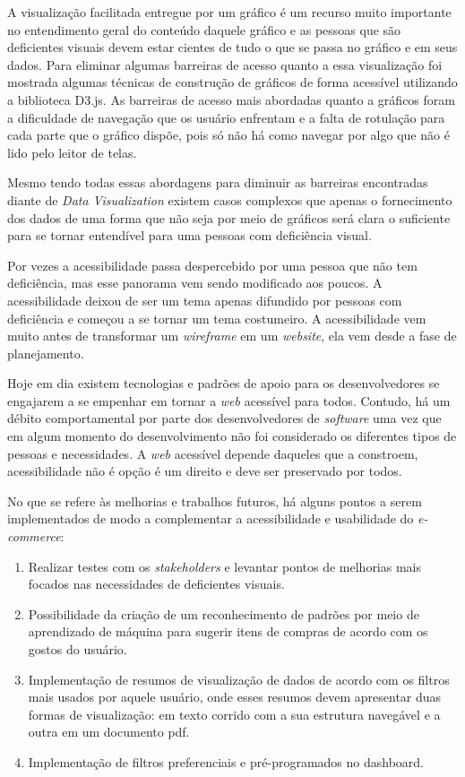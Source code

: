 {A visualização facilitada entregue por um gráfico é um recurso muito importante no entendimento geral do conteúdo daquele gráfico e as pessoas que são deficientes visuais devem estar cientes de tudo o que se passa no gráfico e em seus dados. Para eliminar algumas barreiras de acesso quanto a essa visualização foi mostrada algumas técnicas de construção de gráficos de forma acessível utilizando a biblioteca D3.js. As barreiras de acesso mais abordadas quanto a gráficos foram a dificuldade de navegação que os usuário enfrentam e a falta de rotulação para cada parte que o gráfico dispõe, pois só não há como navegar por algo que não é lido pelo leitor de telas.

Mesmo tendo todas essas abordagens para diminuir as barreiras encontradas diante de \textit{Data Visualization} existem casos complexos que apenas o fornecimento dos dados de uma forma que não seja por meio de gráficos será clara o suficiente para se tornar entendível para uma pessoas com deficiência visual.

Por vezes a acessibilidade passa despercebido por uma pessoa que não tem deficiência, mas esse panorama vem sendo modificado aos poucos. A acessibilidade deixou de ser um tema apenas difundido por pessoas com deficiência e começou a se tornar um tema costumeiro. A acessibilidade vem muito antes de transformar um \textit{wireframe} em um \textit{website}, ela vem desde a fase de planejamento.


Hoje em dia existem tecnologias e padrões de apoio para os desenvolvedores se engajarem a se empenhar em tornar a \textit{web} acessível para todos. Contudo, há um débito comportamental por parte dos desenvolvedores de \textit{software} uma vez que em algum momento do desenvolvimento não foi considerado os diferentes tipos de pessoas e necessidades. A \textit{web} acessível depende daqueles que a constroem, acessibilidade não é opção é um direito e deve ser preservado por todos.  


No que se refere às melhorias e trabalhos futuros, há alguns pontos a serem implementados de modo a complementar a acessibilidade e usabilidade do \textit{e-commerce}: 
\begin{enumerate}
    \item Realizar testes com os \textit{stakeholders} e levantar pontos de melhorias mais focados nas necessidades de deficientes visuais. 
    \item Possibilidade da criação de um reconhecimento de padrões por meio de aprendizado de máquina para sugerir itens de compras de acordo com os gostos do usuário. 
    \item Implementação de resumos de visualização de dados de acordo com os filtros mais usados por aquele usuário, onde esses resumos devem apresentar duas formas de visualização: em texto corrido com a sua estrutura navegável e a outra em um documento pdf. 
    \item Implementação de filtros preferenciais e pré-programados no dashboard. 
\end{enumerate}
}